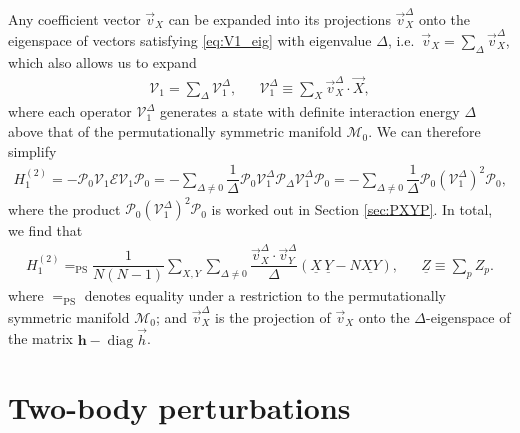 \documentclass[nofootinbib,notitlepage,11pt]{revtex4-2}
\newcommand{\f}[2]{\dfrac{#1}{#2}} %
\newcommand{\p}[1]{\left(#1\right)} %
\renewcommand{\c}{\cdot} %
\newcommand{\m}{\bm} %
\renewcommand{\v}{\vec} %
\newcommand{\1}{\mathds{1}}
\newcommand{\E}{\mathcal{E}}
\newcommand{\M}{\mathcal{M}}
\renewcommand{\P}{\mathcal{P}}
\newcommand{\V}{\mathcal{V}}
\newcommand{\EQPS}{=_{\text{PS}}}
\newcommand{\col}{\underline}
\DeclareMathOperator{\diag}{diag}
\begin{document}
Any coefficient vector $\v v_X$ can be expanded into its projections
$\v v_X^\Delta$ onto the eigenspace of vectors satisfying
\eqref{eq:V1_eig} with eigenvalue $\Delta$,
i.e.~$\v v_X = \sum_\Delta \v v_X^\Delta$, which also allows us to
expand
\begin{align}
  \V_1 = \sum_\Delta \V_1^\Delta,
  &&
  \V_1^\Delta \equiv \sum_X \v v_X^\Delta \c \v X,
\end{align}
where each operator $\V_1^\Delta$ generates a state with definite
interaction energy $\Delta$ above that of the permutationally
symmetric manifold $\M_0$.  We can therefore simplify
\begin{align}
  H_1^{(2)}
  = - \P_0 \V_1 \E \V_1 \P_0
  = - \sum_{\Delta\ne0} \f1{\Delta}
  \P_0 \V_1^\Delta \P_\Delta \V_1^\Delta \P_0
  = - \sum_{\Delta\ne0} \f1{\Delta} \P_0 \p{\V_1^\Delta}^2 \P_0,
\end{align}
where the product $\P_0 \p{\V_1^\Delta}^2 \P_0$ is worked out in
Section \ref{sec:PXYP}.  In total, we find that
\begin{align}
  H_1^{(2)}
  \EQPS \f1{N\p{N-1}} \sum_{X,Y} \sum_{\Delta\ne0}
  \f{\v v_X^\Delta\c\v v_Y^\Delta}{\Delta}
  \p{\col{X}\,\col{Y} - N \col{XY}},
  &&
  \col{Z} \equiv \sum_p Z_p.
  \label{eq:H_1_2}
\end{align}
where $\EQPS$ denotes equality under a restriction to the
permutationally symmetric manifold $\M_0$; and $\v v_X^\Delta$ is the
projection of $\v v_X$ onto the $\Delta$-eigenspace of the matrix
$\m h-\diag\v h$.

\section{Two-body perturbations}
\label{sec:two_body_pert}
\end{document}
